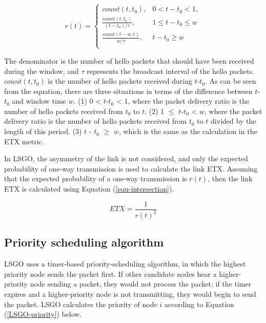 \documentclass[conference]{IEEEtran}
\begin{document}
\begin{equation}
\label{trans-prediction}
r(t) =\begin{cases}count(t, t_{0}), & 0 < t - t_{0} < 1,  \\ \frac{count(t,t_{0})}{(t-t_{0}) / \tau}, & 1 \leq t - t_{0} \leq w\\
\frac{count(t - w,t)}{w / \tau}, &  t - t_{0} \geq w\\
\end{cases}
\end{equation}

The denominator is the number of hello packets that should have been received during the window, and $\tau$ represents the broadcast interval of the hello packets. $count(t,t_{0})$ is the number of hello packets received during $t$-$t_{0}$.  
As can be seen from the equation, there are three situations in terms of the difference between $t$-$t_{0}$ and window time $w$. (1) 0 < $t$-$t_{0}$ < 1, where the packet delivery ratio is the number of hello packets received from $t_{0}$ to $t$. (2) 1 $\leq$ $t$-$t_{0}$ < $w$, where the packet delivery ratio is the number of hello packets received from $t_{0}$ to $t$ divided by the length of this period. (3) $t$ - $t_{0}$ $\geq$ $w$, which is the same as the calculation in the ETX metric.

In LSGO, the asymmetry of the link is not considered, and only the expected probability of one-way transmission is used to calculate the link ETX. 
Assuming that the expected probability of a one-way transmission is $r(t)$, then the link ETX is calculated using Equation (\ref{equ-intersection}).
 
 \begin{equation}
 \label{equ-intersection}
 ETX = \frac{1}{  {r(t)}^{2}   } 
 \end{equation}



\subsection{Priority scheduling algorithm}
LSGO uses a timer-based priority-scheduling algorithm, in which the highest priority node sends the packet first. If other candidate nodes hear a higher-priority node sending a packet, they would not process the packet; if the timer expires and a higher-priority node is not transmitting, they would begin to send the packet. LSGO calculates the priority of node $i$ according to Equation (\ref{LSGO-priority}) below.
\end{document}
